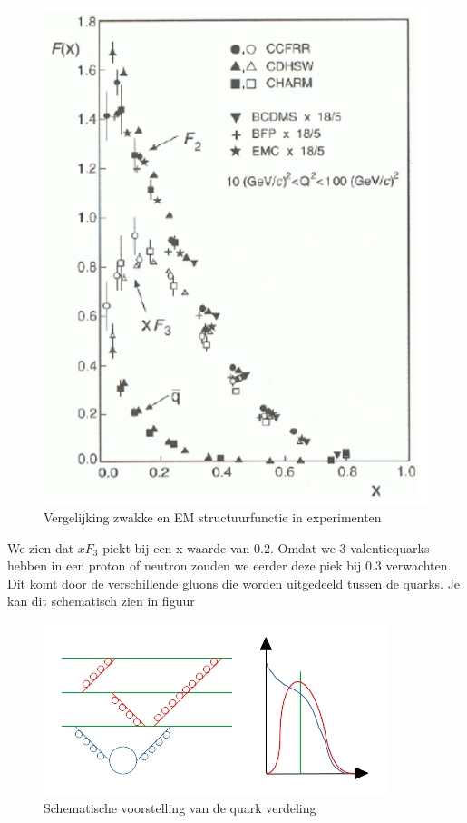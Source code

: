 \documentclass[../main.tex]{subfiles}
\begin{document}
\begin{figure}[h]
    \centering
    \includegraphics[width=0.4\linewidth]{DIS_nucleon_structuur_pdf/neutr_scat_exp.png}
    \caption{Vergelijking zwakke en EM structuurfunctie in experimenten}%
    \label{fig:neutr_scat_exp}
\end{figure}

We zien dat $xF_3$ piekt bij een x waarde van $0.2$. Omdat we 3 valentiequarks hebben in een proton of neutron zouden we eerder deze piek bij $0.3$ verwachten. Dit komt door de verschillende gluons die worden uitgedeeld tussen de quarks. Je kan dit schematisch zien in figuur

\begin{figure}[h]
    \centering
    \includegraphics[width=0.8\linewidth]{DIS_nucleon_structuur_pdf/valance_quark_dist.jpg}
    \caption{Schematische voorstelling van de quark verdeling}%
    \label{fig:valance_quark_dist}
\end{figure}
\end{document}
